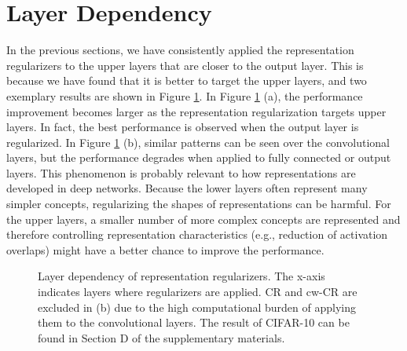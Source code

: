 \section{Layer Dependency}
In the previous sections, we have consistently applied the representation regularizers to the upper layers that are closer to the output layer. This is because we have found that it is better to target the upper layers, and two exemplary results are shown in Figure \ref{fig:layer_dependency}. In Figure \ref{fig:layer_dependency} (a), the performance improvement becomes larger as the representation regularization targets upper layers. In fact, the best performance is observed when the output layer is regularized. In Figure \ref{fig:layer_dependency} (b), similar patterns can be seen over the convolutional layers, but the performance degrades when applied to fully connected or output layers. This phenomenon is probably relevant to how representations are developed in deep networks. Because the lower layers often represent many simpler concepts, regularizing the shapes of representations can be harmful. For the upper layers, a smaller number of more complex concepts are represented and therefore controlling representation characteristics (e.g., reduction of activation overlaps) might have a better chance to improve the performance. 

\begin{figure}[t]
    \centering
    \hspace{-0.4\baselineskip}
    \caption{Layer dependency of representation regularizers. The x-axis indicates layers where regularizers are applied. CR and cw-CR are excluded in (b) due to the high computational burden of applying them to the convolutional layers. The result of CIFAR-10 can be found in Section D of the supplementary materials.}%
    \label{fig:layer_dependency}%
\end{figure}

